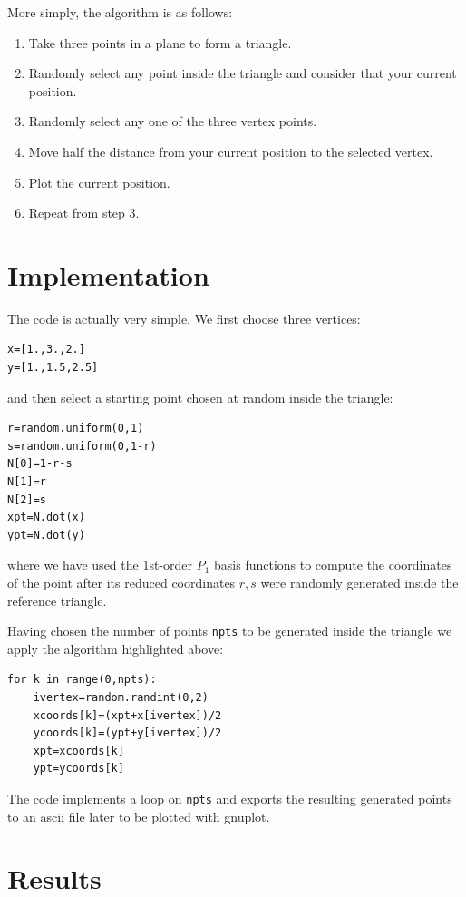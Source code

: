 More simply, the algorithm is as follows:

\begin{enumerate}
\item Take three points in a plane to form a triangle.
\item Randomly select any point inside the triangle and consider that your current position.
\item Randomly select any one of the three vertex points.
\item Move half the distance from your current position to the selected vertex.
\item Plot the current position.
\item Repeat from step 3.
\end{enumerate}

\section*{Implementation}

The code is actually very simple.
We first choose three vertices:
\begin{lstlisting}
x=[1.,3.,2.]
y=[1.,1.5,2.5]
\end{lstlisting}
and then select a starting point chosen at random inside the 
triangle:

\begin{lstlisting}
r=random.uniform(0,1)
s=random.uniform(0,1-r)
N[0]=1-r-s
N[1]=r
N[2]=s
xpt=N.dot(x)
ypt=N.dot(y)
\end{lstlisting}
where we have used the 1st-order $P_1$ basis functions to compute the 
coordinates of the point after its reduced coordinates $r,s$ were
randomly generated inside the reference triangle.

Having chosen the number of points \lstinline{npts} to be generated inside the 
triangle we apply the algorithm highlighted above:

\begin{lstlisting}
for k in range(0,npts):
    ivertex=random.randint(0,2)
    xcoords[k]=(xpt+x[ivertex])/2
    ycoords[k]=(ypt+y[ivertex])/2
    xpt=xcoords[k]
    ypt=ycoords[k]
\end{lstlisting}

The code implements a loop on \lstinline{npts} and exports the 
resulting generated points to an ascii file later to be plotted with gnuplot. 

\section*{Results}

